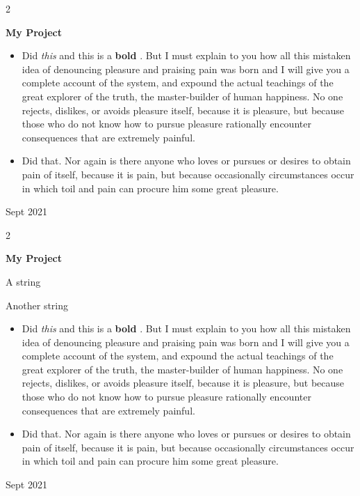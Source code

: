 \documentclass[10pt, letterpaper]{article}
\newenvironment{summary}{
    \begin{description}[
        topsep=0.10 cm,
        parsep=0.10 cm,
        partopsep=0pt,
        itemsep=0pt,
        leftmargin=0.4 cm + 10pt
    ]
}{
    \end{description}
} %
\newenvironment{highlights}{
    \begin{itemize}[
        topsep=0.10 cm,
        parsep=0.10 cm,
        partopsep=0pt,
        itemsep=0pt,
        leftmargin=0.4 cm + 10pt
    ]
}{
    \end{itemize}
} %
\newenvironment{twocolentry}[2][]{
    \onecolentry
    \def\secondColumn{#2}
    \setcolumnwidth{\fill, 4.5 cm}
    \begin{paracol}{2}
}{
    \switchcolumn \raggedleft \secondColumn
    \end{paracol}
    \endonecolentry
} %
\let\hrefWithoutArrow\href
\renewcommand{\href}[2]{\hrefWithoutArrow{#1}{\ifthenelse{\equal{#2}{}}{ }{#2 }\raisebox{.15ex}{\footnotesize \faExternalLink*}}}
\begin{document}
        \vspace{0.2 cm}

        \begin{twocolentry}{
            Sept 2021
        }
            \textbf{My Project}
            \begin{highlights}
                \item Did \textit{this} and this is a \textbf{bold} \href{https://example.com}{link}. But I must explain to you how all this mistaken idea of denouncing pleasure and praising pain was born and I will give you a complete account of the system, and expound the actual teachings of the great explorer of the truth, the master-builder of human happiness. No one rejects, dislikes, or avoids pleasure itself, because it is pleasure, but because those who do not know how to pursue pleasure rationally encounter consequences that are extremely painful.
                \item Did that. Nor again is there anyone who loves or pursues or desires to obtain pain of itself, because it is pain, but because occasionally circumstances occur in which toil and pain can procure him some great pleasure.
            \end{highlights}
        \end{twocolentry}


        \vspace{0.2 cm}

        \begin{twocolentry}{
            Sept 2021
        }
            \textbf{My Project}
            \begin{summary}
                \item A string
                \item Another string
            \end{summary}
            \begin{highlights}
                \item Did \textit{this} and this is a \textbf{bold} \href{https://example.com}{link}. But I must explain to you how all this mistaken idea of denouncing pleasure and praising pain was born and I will give you a complete account of the system, and expound the actual teachings of the great explorer of the truth, the master-builder of human happiness. No one rejects, dislikes, or avoids pleasure itself, because it is pleasure, but because those who do not know how to pursue pleasure rationally encounter consequences that are extremely painful.
                \item Did that. Nor again is there anyone who loves or pursues or desires to obtain pain of itself, because it is pain, but because occasionally circumstances occur in which toil and pain can procure him some great pleasure.
            \end{highlights}
        \end{twocolentry}
\end{document}

